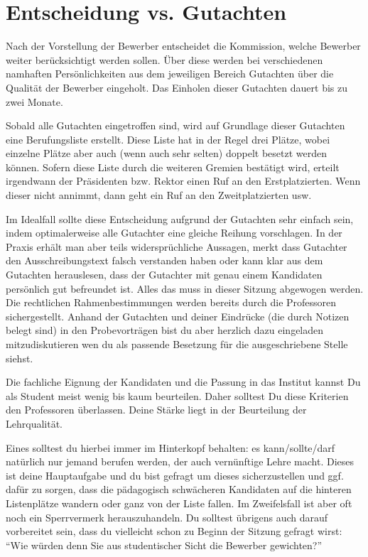 \section{Entscheidung vs. Gutachten}
Nach der Vorstellung der Bewerber entscheidet die Kommission, welche Bewerber weiter berücksichtigt werden sollen. Über diese werden bei verschiedenen namhaften Persönlichkeiten aus dem jeweiligen Bereich Gutachten über die Qualität der Bewerber eingeholt. Das Einholen dieser Gutachten dauert bis zu zwei Monate.

Sobald alle Gutachten eingetroffen sind, wird auf Grundlage dieser Gutachten eine Berufungsliste erstellt. Diese Liste hat in der Regel drei Plätze, wobei einzelne Plätze aber auch (wenn auch sehr selten) doppelt besetzt werden können. Sofern diese Liste durch die weiteren Gremien bestätigt wird, erteilt irgendwann der Präsidenten bzw. Rektor einen Ruf an den Erstplatzierten. Wenn dieser nicht annimmt, dann geht ein Ruf an den Zweitplatzierten usw.

Im Idealfall sollte diese Entscheidung aufgrund der Gutachten sehr einfach sein, indem optimalerweise alle Gutachter eine gleiche Reihung vorschlagen. In der Praxis erhält man aber teils widersprüchliche Aussagen, merkt dass Gutachter den Ausschreibungstext falsch verstanden haben oder kann klar aus dem Gutachten herauslesen, dass der Gutachter mit genau einem Kandidaten persönlich gut befreundet ist. Alles das muss in dieser Sitzung abgewogen werden. Die rechtlichen Rahmenbestimmungen werden bereits durch die Professoren sichergestellt. Anhand der Gutachten und deiner Eindrücke (die durch Notizen belegt sind) in den Probevorträgen bist du aber herzlich dazu eingeladen mitzudiskutieren wen du als passende Besetzung für die ausgeschriebene Stelle siehst.

Die fachliche Eignung der Kandidaten und die Passung in das Institut kannst Du als Student meist wenig bis kaum beurteilen. Daher solltest Du diese Kriterien den Professoren überlassen. Deine Stärke liegt in der Beurteilung der Lehrqualität.

Eines solltest du hierbei immer im Hinterkopf behalten: es kann/sollte/darf natürlich nur jemand berufen werden, der auch vernünftige Lehre macht. Dieses ist deine Hauptaufgabe und du bist gefragt um dieses sicherzustellen und ggf. dafür zu sorgen, dass die pädagogisch schwächeren Kandidaten auf die hinteren Listenplätze wandern oder ganz von der Liste fallen. Im Zweifelsfall ist aber oft noch ein Sperrvermerk herauszuhandeln. Du solltest übrigens auch darauf vorbereitet sein, dass du vielleicht schon zu Beginn der Sitzung gefragt wirst: "`Wie würden denn Sie aus studentischer Sicht die Bewerber gewichten?"'


